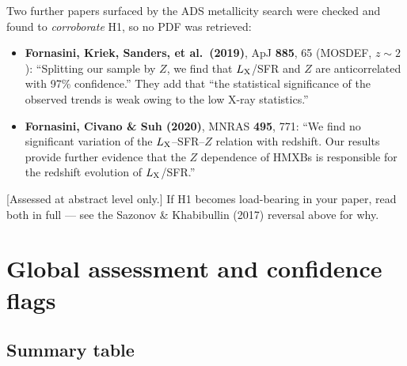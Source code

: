 \documentclass[11pt,a4paper]{article}
\newcommand{\flag}[1]{\textcolor{orange!75!black}{\textsf{\small [#1]}}}
\begin{document}
Two further papers surfaced by the ADS metallicity search were checked and found
to \emph{corroborate} H1, so no PDF was retrieved:

\begin{itemize}[leftmargin=*,itemsep=2pt]
\item \textbf{Fornasini, Kriek, Sanders, et al.\ (2019)}, ApJ \textbf{885}, 65
      (MOSDEF, $z\sim2$): ``Splitting our sample by $Z$, we find that
      $L_{\rm X}$/SFR and $Z$ are anticorrelated with 97\% confidence.''
      They add that ``the statistical significance of the observed trends is
      weak owing to the low X-ray statistics.''
\item \textbf{Fornasini, Civano \& Suh (2020)}, MNRAS \textbf{495}, 771:
      ``We find no significant variation of the $L_{\rm X}$--SFR--$Z$ relation
      with redshift. Our results provide further evidence that the $Z$
      dependence of HMXBs is responsible for the redshift evolution of
      $L_{\rm X}$/SFR.''
\end{itemize}
\flag{Assessed at abstract level only.} If H1 becomes load-bearing in your
paper, read both in full --- see the Sazonov \& Khabibullin (2017) reversal
above for why.

\section{Global assessment and confidence flags}
\label{sec:global}

\subsection{Summary table}
\end{document}
